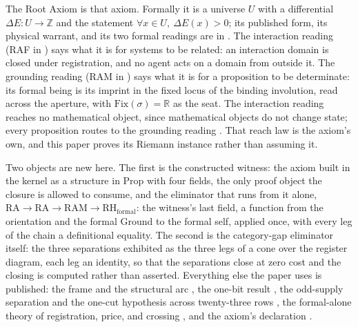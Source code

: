 \documentclass[10pt,twocolumn]{article}
\begin{document}
The Root Axiom is that axiom. Formally it is a universe \(U\) with a
differential \(\Delta E : U \to \mathbb{Z}\) and the statement
\(\forall x \in U,\ \Delta E(x) > 0\); its published form, its physical
warrant, and its two formal readings are in \cite{islamcodex, islamraf}.
The interaction reading (RAF in \cite{islamraf}) says what it is for
systems to be related: an interaction domain is closed under
registration, and no agent acts on a domain from outside it. The
grounding reading (RAM in \cite{islamraf}) says what it is for a
proposition to be determinate: its formal being is its imprint in the
fixed locus of the binding involution, read across the aperture, with
\(\mathrm{Fix}(\sigma) = \mathbb{R}\) as the seat. The interaction
reading reaches no mathematical object, since mathematical objects do
not change state; every proposition routes to the grounding reading
\cite{islamraf, islamfae}. That reach law is the axiom's own, and this
paper proves its Riemann instance rather than assuming it.

Two objects are new here. The first is the constructed witness: the
axiom built in the kernel as a structure in Prop with four fields, the
only proof object the closure is allowed to consume, and the eliminator
that runs from it alone,
\(\mathrm{RA} \to \mathrm{RA} \to \mathrm{RAM} \to \mathrm{RH}_{\mathrm{formal}}\):
the witness's last field, a function from the orientation and the formal
Ground to the formal self, applied once, with every leg of the chain a
definitional equality. The second is the category-gap eliminator itself:
the three separations exhibited as the three legs of a cone over the
register diagram, each leg an identity, so that the separations close at
zero cost and the closing is computed rather than asserted. Everything
else the paper uses is published: the frame and the structural arc
\cite{islamspine}, the one-bit result \cite{islamonebit}, the odd-supply
separation and the one-cut hypothesis across twenty-three rows
\cite{islamrows}, the formal-alone theory of registration, price, and
crossing \cite{islamftoe}, and the axiom's declaration \cite{islamraf}.
\end{document}
